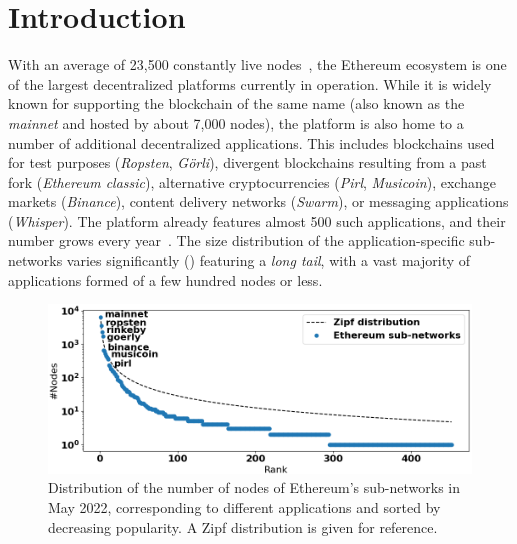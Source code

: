 
\vspace{-1mm}
\section{Introduction}
\vspace{-2mm}

With an average of 23,500 constantly live nodes~\cite{discv4-dns-lists}, the Ethereum ecosystem is one of the largest decentralized platforms currently in operation.
While it is widely known for supporting the blockchain of the same name (also known as the \emph{mainnet} and hosted by about 7,000 nodes), the platform is also home to a number of additional decentralized applications.
This includes blockchains used for test purposes (\emph{Ropsten}, \emph{G\"orli}), divergent blockchains resulting from a past fork (\emph{Ethereum classic}), alternative cryptocurrencies (\emph{Pirl}, \emph{Musicoin}), exchange markets (\emph{Binance}), content delivery networks (\emph{Swarm}), or messaging applications (\emph{Whisper}).
The platform already features almost 500 such applications, and their number grows every year~\cite{discv4-dns-lists}.
The size distribution of the application-specific sub-networks varies significantly () featuring a \emph{long tail}, with a vast majority of applications formed of a few hundred nodes or less.

\begin{figure}[t]
    \includegraphics[width=1\linewidth]{img/ecosystem}
    \vspace{-0.15in}
    \caption{Distribution of the number of nodes of Ethereum's sub-networks in May 2022, corresponding to different applications and sorted by decreasing popularity.
    A Zipf distribution is given for reference.
    }
    \vspace{-0.20in}
    \label{fig:ecosystem}
\end{figure}


